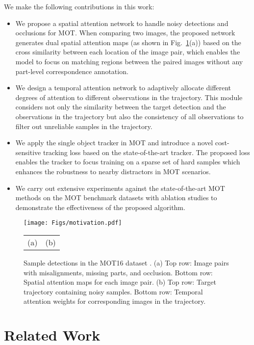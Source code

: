 \documentclass[runningheads]{llncs}
\begin{document}
  We make the following contributions in this work:
  \vspace{-3mm}
  \begin{itemize}[label=]
  \item We propose a spatial attention network to handle noisy detections and occlusions for MOT. 
When comparing two images, the proposed network generates dual spatial attention maps (as shown in Fig.~\ref{fig:motivation}(a)) based on the cross similarity between each location of the image pair, which enables the model to focus on matching regions between the paired images without any part-level correspondence annotation.
\item We design a temporal attention network to adaptively allocate different degrees of attention to different observations in the trajectory. 
This module considers not only the similarity between the target detection and the observations in the trajectory but also the consistency of all observations to filter out unreliable samples in the trajectory.
\item We apply the single object tracker in MOT and introduce a novel cost-sensitive tracking loss based on the state-of-the-art tracker. 
The proposed loss enables the tracker to focus training on a sparse set of hard samples which enhances the robustness to nearby distractors in MOT scenarios.
\item We carry out extensive experiments against the state-of-the-art MOT methods on the MOT benchmark datasets with 
  ablation studies to demonstrate the effectiveness of the proposed algorithm.
  \end{itemize}
  
   \begin{figure}[t]
    \centering
    \texttt{[image: Figs/motivation.pdf]}\\
    \begin{tabular}{@{}C{0.51\textwidth}C{0.5\textwidth}@{}}
    (a) & (b)\\
    \end{tabular}
    \caption{Sample detections in the MOT16 dataset \cite{MOT16}. (a) Top row: Image pairs with misalignments, missing parts, and occlusion. 
Bottom row: Spatial attention maps for each image pair. (b) Top row: Target trajectory containing noisy samples. Bottom row: Temporal attention weights for corresponding images in the trajectory.}
\label{fig:motivation}
  \end{figure}
  
\section{Related Work}
\end{document}
